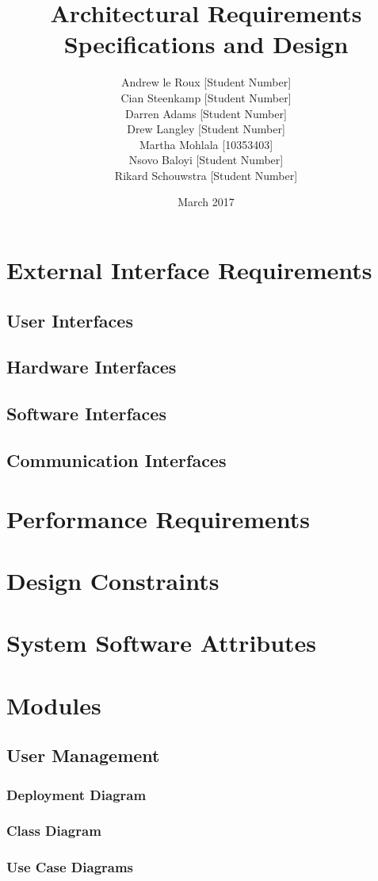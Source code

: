 \documentclass{article}
\title{Architectural Requirements Specifications and Design}
\author{Andrew le Roux \hfill [Student Number] \\ Cian Steenkamp \hfill [Student Number] \\ Darren Adams \hfill [Student Number] \\ Drew Langley \hfill [Student Number] \\ Martha Mohlala \hfill [10353403] \\ Nsovo Baloyi \hfill [Student Number] \\ Rikard Schouwstra \hfill [Student Number]}
\date{March 2017}
\begin{document}
\maketitle
\pagebreak
\tableofcontents
\pagebreak
\section{External Interface Requirements}
    \subsection{User Interfaces}
    \subsection{Hardware Interfaces}
    \subsection{Software Interfaces}
    \subsection{Communication Interfaces}
\section{Performance Requirements}
\section{Design Constraints}
\section{System Software Attributes}
\section{Modules}
    \subsection{User Management}
        \subsubsection{Deployment Diagram}
        \subsubsection{Class Diagram}
        \subsubsection{Use Case Diagrams}
\end{document}
